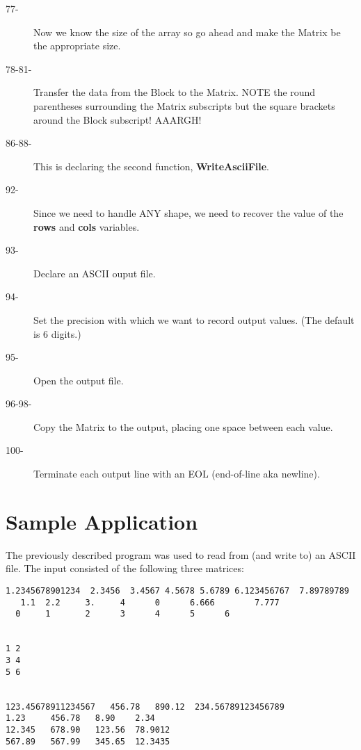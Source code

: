 \begin{description}
\item[77-] Now we know the size of the array so go ahead and make the Matrix be the
appropriate size.

\item[78-81-] Transfer the data from the Block to the Matrix. NOTE the round 
parentheses surrounding the Matrix subscripts but the square brackets around
the Block subscript!  AAARGH!

\item[86-88-] This is declaring the second function, {\bf WriteAsciiFile}.

\item[92-] Since we need to handle ANY shape, we need to recover the value of the
{\bf rows} and {\bf cols} variables.

\item[93-] Declare an ASCII ouput file.

\item[94-] Set the precision with which we want to record output values. (The default
is 6 digits.)

\item[95-] Open the output file.

\item[96-98-] Copy the Matrix to the output, placing one space between each value.

\item[100-] Terminate each output line with an EOL (end-of-line aka newline).
\end{description}

\section{Sample Application}

        The previously described program was used to read from (and write to)
an ASCII file.  The input consisted of the following three matrices:


\begin{verbatim}
1.2345678901234  2.3456  3.4567 4.5678 5.6789 6.123456767  7.89789789
   1.1  2.2     3.     4      0      6.666        7.777       
  0     1       2      3      4      5      6


1 2
3 4
5 6


123.45678911234567   456.78   890.12  234.56789123456789
1.23     456.78   8.90    2.34
12.345   678.90   123.56  78.9012
567.89   567.99   345.65  12.3435
\end{verbatim}

